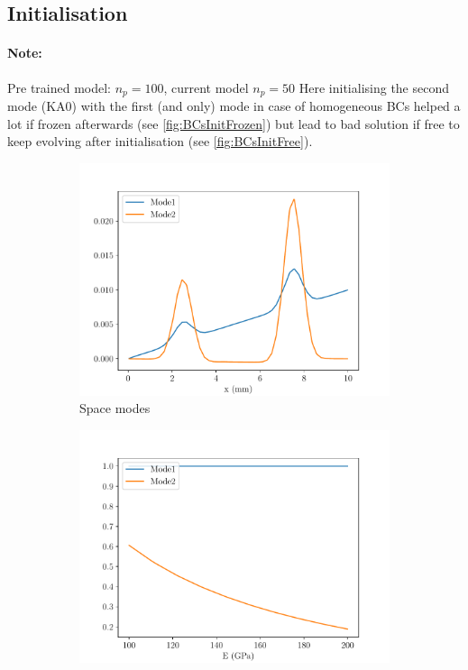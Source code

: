 \subsection{Initialisation} 
\paragraph{Note:} Pre trained model: $n_p = 100$, current model $n_p = 50$
Here initialising the second mode (KA0) with the first (and only) mode in case of homogeneous BCs helped a lot if frozen afterwards (see \ref{fig:BCsInitFrozen}) but lead to bad solution if free to keep evolving after initialisation (see \ref{fig:BCsInitFree}).

\begin{figure}
\begin{subfigure}[t]{0.5\linewidth}
    \centering
    \includegraphics[width=\linewidth]{Figures/Pre_trained_Space_modes2_frozen.pdf}
    \caption{Space modes }
\end{subfigure}
  \begin{subfigure}[t]{0.5\linewidth}
    \centering
    \includegraphics[width=\linewidth]{Figures/Pre_trained_Para_modes2_frozen.pdf}

\end{subfigure}
\end{figure}
